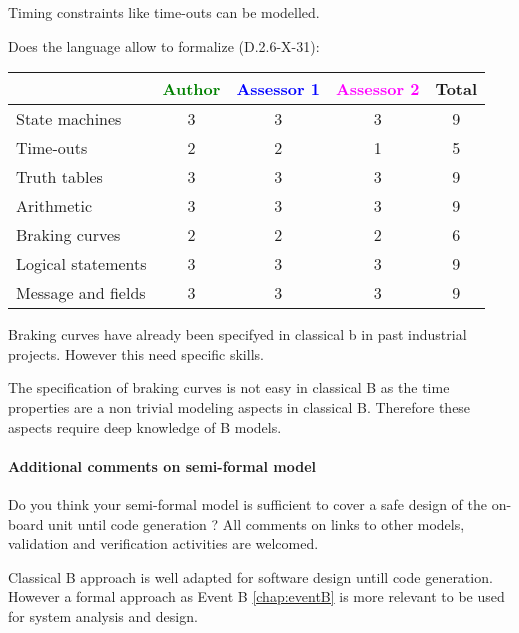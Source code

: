 \begin{author_comment}
Timing constraints like time-outs can be modelled.
\end{author_comment}


Does the language allow to  formalize (D.2.6-X-31):

\begin{tabular}{|l | c | c | c | c|}
\hline
& \textcolor{green}{Author} & \textcolor{blue}{Assessor 1} & \textcolor{magenta}{Assessor 2} & Total \\
\hline 
State machines  & 3 & 3 & 3 & 9 \\
\hline
Time-outs  & 2 & 2 & 1 & 5  \\
\hline
Truth tables  & 3 & 3 & 3 & 9 \\
\hline
Arithmetic  & 3 & 3 & 3 & 9 \\
\hline
Braking curves  & 2 & 2 & 2 & 6 \\
\hline
Logical statements & 3 & 3 & 3 & 9 \\
\hline
Message and fields & 3 & 3 & 3 & 9 \\
\hline
\end{tabular}


\begin{author_comment}
Braking curves have already been specifyed in classical b  in past industrial projects. However this need specific skills.
\end{author_comment}


\begin{assessor2}
The specification of braking curves is not easy in classical B as the time properties are a non trivial modeling aspects in classical B. Therefore these aspects require deep knowledge of B models.
\end{assessor2}

\paragraph{Additional comments on semi-formal  model} Do you think your semi-formal  model is sufficient to cover a safe design of the on-board unit until code generation ?
All comments on links to  other models, validation and verification activities are welcomed.



\begin{author_comment}
Classical B  approach is well adapted for software design untill code generation. However a formal approach as Event B \ref{chap:eventB} is more relevant to be used for system analysis and design.
\end{author_comment}


